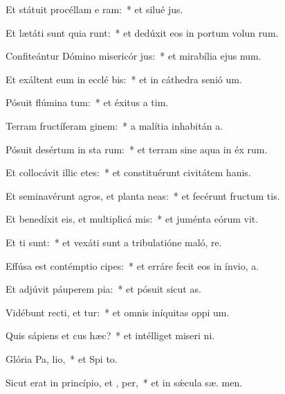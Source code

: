 \item Et státuit procéllam e  ram:~* et silué  jus.
\item Et lætáti sunt quia runt:~* et dedúxit eos in portum volun rum.
\item Confiteántur Dómino misericór jus:~* et mirabília ejus  num.
\item Et exáltent eum in ecclé bis:~* et in cáthedra senió  um.
\item Pósuit flúmina  tum:~* et éxitus a  tim.
\item Terram fructíferam  ginem:~* a malítia inhabitán  a.
\item Pósuit desértum in sta rum:~* et terram sine aqua in éx rum.
\item Et collocávit illic etes:~* et constituérunt civitátem hanis.
\item Et seminavérunt agros, et planta neas:~* et fecérunt fructum tis.
\item Et benedíxit eis, et multiplicá  mis:~* et juménta eórum  vit.
\item Et  ti sunt:~* et vexáti sunt a tribulatióne maló,  re.
\item Effúsa est contémptio  cipes:~* et erráre fecit eos in ínvio,    a.
\item Et adjúvit páuperem  pia:~* et pósuit sicut  as.
\item Vidébunt recti, et tur:~* et omnis iníquitas oppi  um.
\item Quis sápiens et cus hæc?~* et intélliget miseri ni.
\item Glória Pa,  lio,~* et Spi to.
\item Sicut erat in princípio, et ,  per,~* et in sǽcula sæ. men.
